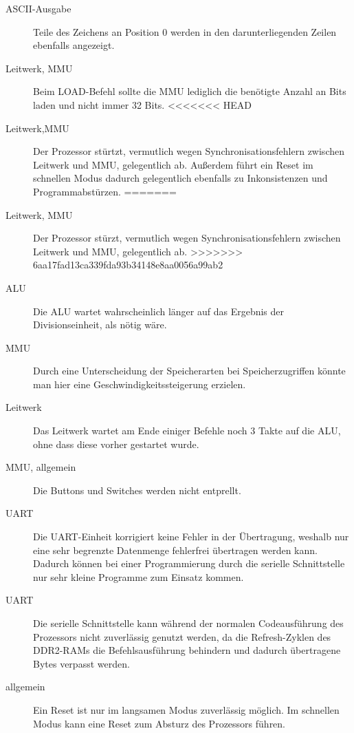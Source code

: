 \begin{description}
\item[ASCII-Ausgabe] Teile des Zeichens an Position 0 werden in den
darunterliegenden Zeilen ebenfalls angezeigt.
\item[Leitwerk, MMU] Beim LOAD-Befehl sollte die MMU lediglich die ben\"otigte
Anzahl an Bits laden und nicht immer 32 Bits.
<<<<<<< HEAD
\item[Leitwerk,MMU] Der Prozessor st\"urtzt, vermutlich wegen
Synchronisationsfehlern zwischen Leitwerk und MMU, gelegentlich ab. Au\ss{}erdem f\"uhrt ein Reset im schnellen Modus dadurch gelegentlich ebenfalls zu Inkonsistenzen und Programmabst\"urzen.
=======
\item[Leitwerk, MMU] Der Prozessor st\"urzt, vermutlich wegen
Synchronisationsfehlern zwischen Leitwerk und MMU, gelegentlich ab.
>>>>>>> 6aa17fad13ca339fda93b34148e8aa0056a99ab2
\item[ALU] Die ALU wartet wahrscheinlich l\"anger auf das Ergebnis der
Divisionseinheit, als n\"otig w\"are.
\item[MMU] Durch eine Unterscheidung der Speicherarten bei Speicherzugriffen
k\"onnte man hier eine Geschwindigkeitssteigerung erzielen.
\item[Leitwerk] Das Leitwerk wartet am Ende einiger Befehle noch 3 Takte auf
die ALU, ohne dass diese vorher gestartet wurde.
\item[MMU, allgemein] Die Buttons und Switches werden nicht entprellt.
\item[UART] Die UART-Einheit korrigiert keine Fehler in der \"Ubertragung,
weshalb nur eine sehr begrenzte Datenmenge fehlerfrei \"ubertragen werden kann.
Dadurch k\"onnen bei einer Programmierung durch die serielle Schnittstelle nur
sehr kleine Programme zum Einsatz kommen.
\item[UART] Die serielle Schnittstelle kann w\"ahrend der normalen
Codeausf\"uhrung des Prozessors nicht zuverl\"assig genutzt werden, da die
Refresh-Zyklen des DDR2-RAMs die Befehlsausf\"uhrung behindern und dadurch
\"ubertragene Bytes verpasst werden.
\item[allgemein] Ein Reset ist nur im langsamen Modus zuverl\"assig m\"oglich. Im
schnellen Modus kann eine Reset zum Absturz des Prozessors f\"uhren.
\end{description}
